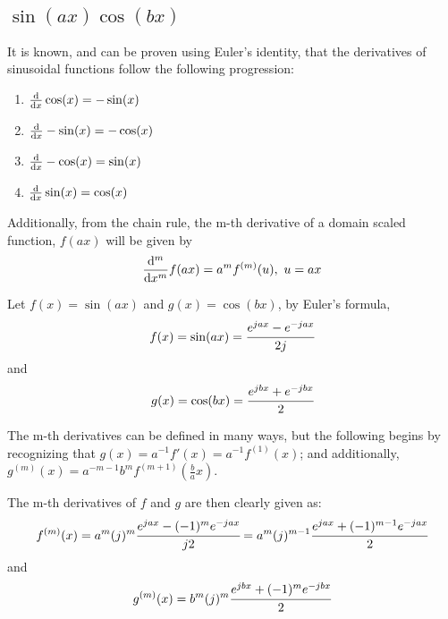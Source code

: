 \documentclass[]{article}
\begin{document}
\subsection{
    $\sin(ax)\cos(bx)$
}
It is known, and can be proven using Euler's identity, that the derivatives of sinusoidal functions follow the following progression:
    \begin{enumerate}
        \item $\dv{x} \cos(x) = - \sin(x)$
        \item $\dv{x} -\sin(x) = - \cos(x)$
        \item $\dv{x} -\cos(x) = \sin(x)$
        \item $\dv{x} \sin(x) = \cos(x)$
    \end{enumerate}
Additionally, from the chain rule, the m-th derivative of a domain scaled function, $f(a x)$ will be given by
\[
    \dv[m]{x} f(a x) = a^{m} f^{(m)}(u), \ u = a x
\]

Let $f(x) = \sin(ax)$ and $g(x) = \cos(bx)$, by Euler's formula,
\[
    f(x) = \sin(ax) = \cfrac{e^{j a x} - e^{- j a x}}{2 j}
\]
and
\[
    g(x) = \cos(bx) = \cfrac{e^{j b x} + e^{-j b x}}{2}
\]

The m-th derivatives can be defined in many ways, but the following begins by recognizing that $g(x) = a^{-1} f'(x) = a^{-1} f^{(1)}(x)$; and additionally, $g^{(m)}(x) = a^{-m - 1} b^{m} f^{(m + 1)}(\frac{b}{a}x)$.


The m-th derivatives of $f$ and $g$ are then clearly given as:
\[
    f^{(m)}(x) 
    = a^m (j)^{m} \cfrac{e^{j a x} - (-1)^{m} e^{- j a x}}{j 2}
    = a^m (j)^{m - 1} \cfrac{e^{j a x} + (-1)^{m - 1} e^{- j a x}}{2}
\]
and 
\[
    g^{(m)}(x) 
    = b^m (j)^{m} \cfrac{e^{j b x} + (-1)^{m} e^{- j b x}}{2}
\]
\end{document}
